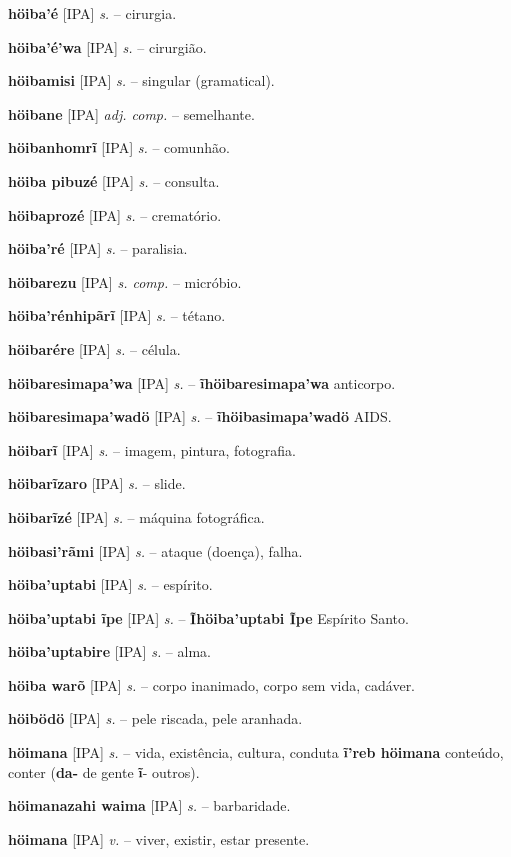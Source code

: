 \textbf{höiba'é} [IPA] \textit{s.} -- cirurgia.

\textbf{höiba'é'wa} [IPA] \textit{s.} -- cirurgião.

\textbf{höibamisi} [IPA] \textit{s.} -- singular (gramatical).

\textbf{höibane} [IPA] \textit{adj. comp.} -- semelhante.

\textbf{höibanhomrĩ} [IPA] \textit{s.} -- comunhão.

\textbf{höiba pibuzé} [IPA] \textit{s.} -- consulta.

\textbf{höibaprozé} [IPA] \textit{s.} -- crematório.

\textbf{höiba'ré} [IPA] \textit{s.} -- paralisia.

\textbf{höibarezu} [IPA] \textit{s. comp.} -- micróbio.

\textbf{höiba'rénhipãrĩ} [IPA] \textit{s.} -- tétano.

\textbf{höibarére} [IPA] \textit{s.} -- célula.

\textbf{höibaresimapa'wa} [IPA] \textit{s.} -- \textbf{ĩhöibaresimapa'wa} anticorpo.

\textbf{höibaresimapa'wadö} [IPA] \textit{s.} -- \textbf{ĩhöibasimapa'wadö} AIDS.

\textbf{höibarĩ} [IPA] \textit{s.} -- imagem, pintura, fotografia.

\textbf{höibarĩzaro} [IPA] \textit{s.} -- slide.

\textbf{höibarĩzé} [IPA] \textit{s.} -- máquina fotográfica.

\textbf{höibasi'rãmi} [IPA] \textit{s.} -- ataque (doença), falha.

\textbf{höiba'uptabi} [IPA] \textit{s.} -- espírito.

\textbf{höiba'uptabi ĩpe} [IPA] \textit{s.} -- \textbf{Ĩhöiba'uptabi Ĩpe} Espírito Santo.

\textbf{höiba'uptabire} [IPA] \textit{s.} -- alma.

\textbf{höiba warõ} [IPA] \textit{s.} -- corpo inanimado, corpo sem vida, cadáver.

\textbf{höibödö} [IPA] \textit{s.} -- pele riscada, pele aranhada.

\textbf{höimana} [IPA] \textit{s.} -- vida, existência, cultura, conduta  \textbf{ĩ'reb höimana} conteúdo, conter (\textbf{da-} de gente  \textbf{ĩ}- outros).

\textbf{höimanazahi waima} [IPA] \textit{s.} -- barbaridade.

\textbf{höimana} [IPA] \textit{v.} -- viver, existir, estar presente.

